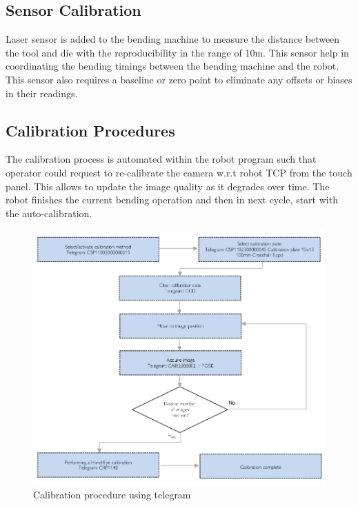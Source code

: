 \subsection{Sensor Calibration}
Laser sensor is added to the bending machine to measure the distance between the tool and die with the reproducibility in the range of 10\textmu m. This sensor help in coordinating the bending timings between the bending machine and the robot. This sensor also requires a baseline or zero point to eliminate any offsets or biases in their readings.

\subsection{Calibration Procedures}

The calibration process is automated within the robot program
such that operator could request to re-calibrate the camera w.r.t
robot TCP from the touch panel. This allows to update the image quality as it degrades over time. 
The robot finishes the current
bending operation and then in next cycle, start with the auto-calibration.

\begin{figure}[h]
    \centering
    \includegraphics[width=\textwidth]{6. System Integration and Testing/6.2 Calibration Procedures/graph.png}
    \caption{Calibration procedure using telegram}
    \label{calib-graph:tcp}
\end{figure}

